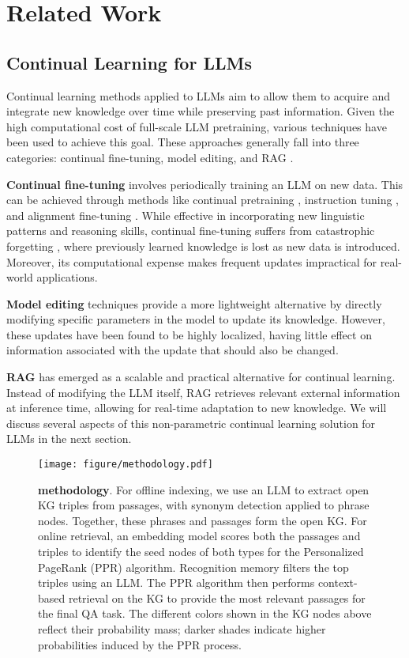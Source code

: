 \section{Related Work}
\subsection{Continual Learning for LLMs}

Continual learning methods applied to LLMs aim to allow them to acquire and integrate new knowledge over time while preserving past information. 
Given the high computational cost of full-scale LLM pretraining, various techniques have been used to achieve this goal. 
These approaches generally fall into three categories: continual fine-tuning, model editing, and RAG \cite{shi2024continual}.

\textbf{Continual fine-tuning} involves periodically training an LLM on new data. This can be achieved through methods like continual pretraining \cite{lifelong}, instruction tuning \cite{citb}, and alignment fine-tuning \cite{copr}. 
While effective in incorporating new linguistic patterns and reasoning skills, continual fine-tuning suffers from catastrophic forgetting \cite{huang24mitigating}, where previously learned knowledge is lost as new data is introduced. Moreover, its computational expense makes frequent updates impractical for real-world applications.

\textbf{Model editing} techniques \cite{yao23editing} provide a more lightweight alternative by directly modifying specific parameters in the model to update its knowledge. However, these updates have been found to be highly localized, having little effect on information associated with the update that should also be changed.

\textbf{RAG} has emerged as a scalable and practical alternative for continual learning. Instead of modifying the LLM itself, RAG retrieves relevant external information at inference time, allowing for real-time adaptation to new knowledge. 
We will discuss several aspects of this non-parametric continual learning solution for LLMs in the next section.


\begin{figure*}
    \centering
    \texttt{[image: figure/methodology.pdf]}
      \vskip -0.1in
    \caption{\textbf{\ours methodology}.
    For offline indexing, we use an LLM to extract open KG triples from passages, with synonym detection applied to phrase nodes. Together, these phrases and passages form the open KG. 
    For online retrieval, an embedding model scores both the passages and triples to identify the seed nodes of both types for the Personalized PageRank (PPR) algorithm. Recognition memory filters the top triples using an LLM. The PPR algorithm then performs context-based retrieval on the KG to provide the most relevant passages for the final QA task. The different colors shown in the KG nodes above reflect their probability mass; darker shades indicate higher probabilities induced by the PPR process.
    }
    \label{fig:methodology}
  \vskip -0.1in
\end{figure*}

